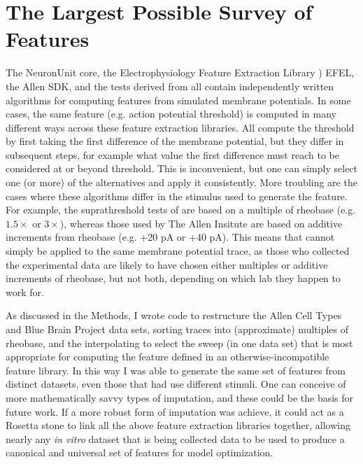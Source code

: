 \section{The Largest Possible Survey of Features}
The NeuronUnit core, the Electrophysiology Feature Extraction Library \citep{EFEL}) EFEL, the Allen SDK, and the tests derived from \citep{druckmann2008evaluating} all contain independently written algorithms for computing features from simulated membrane potentials.
In some cases, the same feature (e.g. action potential threshold) is computed in many different ways across these feature extraction libraries.
All compute the threshold by first taking the first difference of the membrane potential, but they differ in subsequent steps, for example what value the first difference must reach to be considered at or beyond threshold.
This is inconvenient, but one can simply select one (or more) of the alternatives and apply it consistently.
More troubling are the cases where these algorithms differ in the stimulus used to generate the feature.
For example, the suprathreshold tests of \citep{druckmann2008evaluating} are based on a multiple of rheobase (e.g. $1.5\times$ or $3\times$), whereas those used by The Allen Insitute are based on additive increments from rheobase (e.g. +20 pA or +40 pA).
This means that cannot simply be applied to the same membrane potential trace, as those who collected the experimental data are likely to have chosen either multiples or additive increments of rheobase, but not both, depending on which lab they happen to work for.

As discussed in the Methods, I wrote code to restructure the Allen Cell Types and Blue Brain Project data sets, sorting traces into (approximate) multiples of rheobase, and the interpolating to select the sweep (in one data set) that is most appropriate for computing the feature defined in an otherwise-incompatible feature library.
In this way I was able to generate the same set of features from distinct datasets, even those that had use different stimuli.
One can conceive of more mathematically savvy types of imputation, and these could be the basis for future work.
If a more robust form of imputation was achieve, it could act as a Rosetta stone to link all the above feature extraction libraries together, allowing nearly any \emph{in vitro} dataset that is being collected data to be used to produce a canonical and universal set of features for model optimization.

